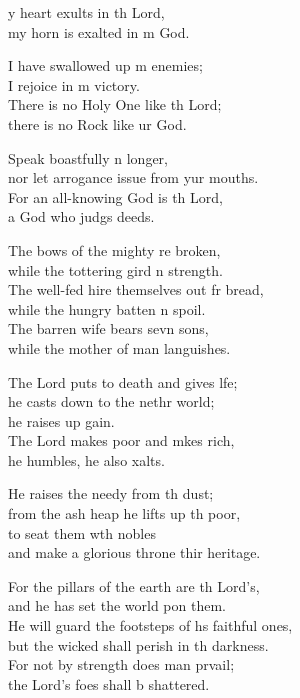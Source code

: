 \settowidth{\versewidth}{He will guard the footsteps of his faithful ones, *}
\begin{psalmverse}%
  \begin{patverse}
    y heart exults in th Lord,\Med\\
my horn is exalted in m God.

I have swallowed up m enemies;\Med\\
I rejoice in m victory.\\
There is no Holy One like th Lord;\Med\\
there is no Rock like ur God.

Speak boastfully n longer,\Med\\
nor let arrogance issue from yur mouths.\\
For an all-knowing God is th Lord,\Med\\
a God who judgs deeds.

The bows of the mighty re broken,\Med\\
while the tottering gird n strength.\\
The well-fed hire themselves out fr bread,\Med\\
while the hungry batten n spoil.\\
The barren wife bears sevn sons,\Med\\
while the mother of man languishes.

The Lord puts to death and gives l\pointup{\i}fe;\Flex\\
he casts down to the nethr world;\Med\\
he raises up gain.\\
The Lord makes poor and mkes rich,\Med\\
he humbles, he also xalts.

He raises the needy from th dust;\Med\\
from the ash heap he lifts up th poor,\\
to seat them w\pointup{\i}th nobles\Med\\
and make a glorious throne thir heritage.

For the pillars of the earth are th Lord’s,\Med\\
and he has set the world pon them.\\
He will guard the footsteps of h\pointup{\i}s faithful ones,\Med\\
but the wicked shall perish in th darkness.\\
For not by strength does man prvail;\Med\\
the Lord’s foes shall b shattered.


\end{patverse}
\end{psalmverse}
